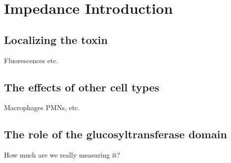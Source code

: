 \chapter{Impedance Introduction}

\section{Localizing the toxin}
Fluorescences etc.

\section{The effects of other cell types}
Macrophages PMNs, etc.

\section{The role of the glucosyltransferase domain}
How much are we really measuring it?


